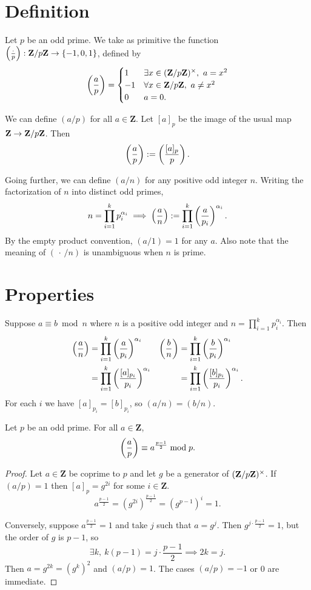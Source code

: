 


\section{Definition}

Let $p$ be an odd prime. We take as primitive the function $\left(\frac{\cdot}{p}\right):\mathbf{Z}/p\mathbf{Z}\to\{-1,0,1\}$, defined by
\[\left(\frac{a}{p}\right)=
  \begin{cases}
    1&\exists x\in(\mathbf{Z}/p\mathbf{Z})^\times,\ a=x^2\\
    -1&\forall x\in\mathbf{Z}/p\mathbf{Z},\ a\neq x^2\\
    0&a=0.
  \end{cases}
\]

We can define $(a/p)$ for all $a\in\mathbf{Z}$. Let $[a]_{p}$ be the image of the usual map $\mathbf{Z}\to\mathbf{Z}/p\mathbf{Z}$. Then
\[\left(\frac{a}{p}\right):=\left(\frac{[a]_{p}}{p}\right).\]

Going further, we can define $(a/n)$ for any positive odd integer $n$. Writing the factorization of $n$ into distinct odd primes,
\[n=\prod_{i=1}^kp_i^{\alpha_i}\implies\left(\frac{a}{n}\right):=\prod_{i=1}^k\left(\frac{a}{p_i}\right)^{\alpha_i}.\]
By the empty product convention, $(a/1)=1$ for any $a$. Also note that the meaning of $(\,\cdot\,/n)$ is unambiguous when $n$ is prime.

\section{Properties}

Suppose $a\equiv b\bmod n$ where $n$ is a positive odd integer and $n=\prod_{i=1}^kp_i^{\alpha_i}$. Then
\begin{align*}
\left(\frac{a}{n}\right)&=\prod_{i=1}^k\left(\frac{a}{p_i}\right)^{\alpha_i}&\left(\frac{b}{n}\right)&=\prod_{i=1}^k\left(\frac{b}{p_i}\right)^{\alpha_i}\\
&=\prod_{i=1}^k\left(\frac{[a]_{p_i}}{p_i}\right)^{\alpha_i}&&=\prod_{i=1}^k\left(\frac{[b]_{p_i}}{p_i}\right)^{\alpha_i}.\\
\end{align*}
For each $i$ we have $[a]_{p_i}=[b]_{p_i}$, so $(a/n)=(b/n)$.

\begin{thm*}
Let $p$ be an odd prime. For all $a\in\mathbf{Z}$,
\[\left(\frac{a}{p}\right)\equiv a^\frac{p-1}{2}\bmod p.\]
\end{thm*}

\begin{proof}
Let $a\in\mathbf{Z}$ be coprime to $p$ and let $g$ be a generator of $(\mathbf{Z}/p\mathbf{Z})^\times$. If $(a/p) = 1$ then $[a]_p = g^{2i}$ for some $i\in\mathbf{Z}$.
\[a^\frac{p-1}{2} = (g^{2i})^\frac{p-1}{2} = (g^{p-1})^i = 1.\]

Conversely, suppose $a^\frac{p-1}{2} = 1$ and take $j$ such that $a = g^j$. Then $g^{j\cdot\frac{p-1}{2}} = 1$, but the order of $g$ is $p-1$, so
\[\exists k,\ k(p-1)=j\cdot\frac{p-1}{2}\implies 2k=j.\]
Then $a = g^{2k} = (g^k)^2$ and $(a/p) = 1$. The cases $(a/p) = -1$ or 0 are immediate.
\end{proof}

